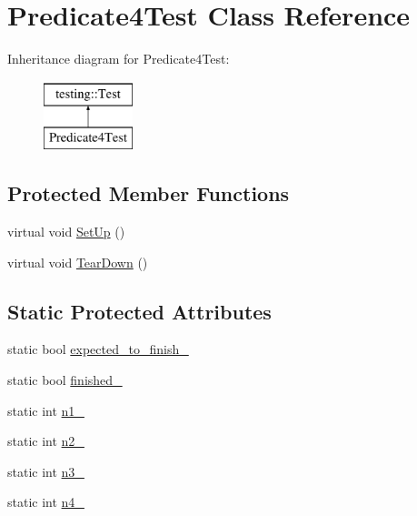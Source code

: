 \hypertarget{classPredicate4Test}{}\section{Predicate4\+Test Class Reference}
\label{classPredicate4Test}
Inheritance diagram for Predicate4\+Test\+:\begin{figure}[H]
\begin{center}
\leavevmode
\includegraphics[height=2.000000cm]{classPredicate4Test}
\end{center}
\end{figure}
\subsection*{Protected Member Functions}
\begin{DoxyCompactItemize}
\item 
virtual void \mbox{\hyperlink{classPredicate4Test_afcf9db5dc68e97291813cdfeb2aaa5d2}{Set\+Up}} ()
\item 
virtual void \mbox{\hyperlink{classPredicate4Test_ab61983a4cdf3657b02bc2b81b67729c4}{Tear\+Down}} ()
\end{DoxyCompactItemize}
\subsection*{Static Protected Attributes}
\begin{DoxyCompactItemize}
\item 
static bool \mbox{\hyperlink{classPredicate4Test_a20600b5eda187c42ce4e812e77269654}{expected\+\_\+to\+\_\+finish\+\_\+}}
\item 
static bool \mbox{\hyperlink{classPredicate4Test_acfd174bf9dfb5a91afbcdca17e797888}{finished\+\_\+}}
\item 
static int \mbox{\hyperlink{classPredicate4Test_a8eb30cd283e613f7a2e501a3969be9ae}{n1\+\_\+}}
\item 
static int \mbox{\hyperlink{classPredicate4Test_a088fce743c747e3851c926cb3a87fda3}{n2\+\_\+}}
\item 
static int \mbox{\hyperlink{classPredicate4Test_a00ae6ae54c7d6639d448c036aedb6114}{n3\+\_\+}}
\item 
static int \mbox{\hyperlink{classPredicate4Test_ae42e23ce11e3f1c6b813496d6180cc67}{n4\+\_\+}}
\end{DoxyCompactItemize}
